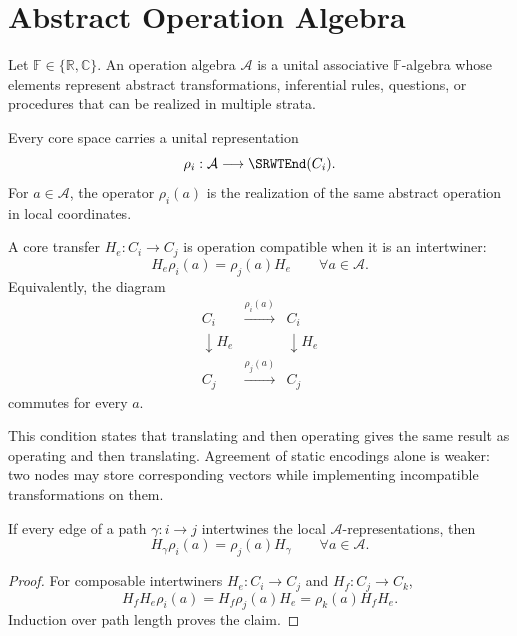 \section{Abstract Operation Algebra}

\begin{SRWTdefinition}\label{SRWT:def:operation-algebra}
Let \(\mathbb F\in\{\mathbb R,\mathbb C\}\). An operation algebra
\(\mathcal A\) is a unital associative \(\mathbb F\)-algebra whose elements
represent abstract transformations, inferential rules, questions, or
procedures that can be realized in multiple strata.
\end{SRWTdefinition}

Every core space carries a unital representation
\[
\rho_i:\mathcal A\longrightarrow\SRWTEnd(C_i).
\]
For \(a\in\mathcal A\), the operator \(\rho_i(a)\) is the realization of the
same abstract operation in local coordinates.

\begin{SRWTdefinition}\label{SRWT:def:intertwiner}
A core transfer \(H_e:C_i\to C_j\) is operation compatible when it is an
intertwiner:
\[
\boxed{
H_e\rho_i(a)=\rho_j(a)H_e
}
\qquad
\forall a\in\mathcal A.
\]
Equivalently, the diagram
\[
\begin{array}{ccc}
C_i&\xrightarrow{\rho_i(a)}&C_i\\
\downarrow H_e&&\downarrow H_e\\
C_j&\xrightarrow{\rho_j(a)}&C_j
\end{array}
\]
commutes for every \(a\).
\end{SRWTdefinition}

This condition states that translating and then operating gives the same
result as operating and then translating. Agreement of static encodings alone
is weaker: two nodes may store corresponding vectors while implementing
incompatible transformations on them.

\begin{SRWTproposition}\label{SRWT:prop:path-intertwiner}
If every edge of a path \(\gamma:i\to j\) intertwines the local
\(\mathcal A\)-representations, then
\[
H_\gamma\rho_i(a)=\rho_j(a)H_\gamma
\qquad
\forall a\in\mathcal A.
\]
\end{SRWTproposition}

\begin{proof}
For composable intertwiners \(H_e:C_i\to C_j\) and
\(H_f:C_j\to C_k\),
\[
H_fH_e\rho_i(a)
=H_f\rho_j(a)H_e
=\rho_k(a)H_fH_e.
\]
Induction over path length proves the claim.
\end{proof}

